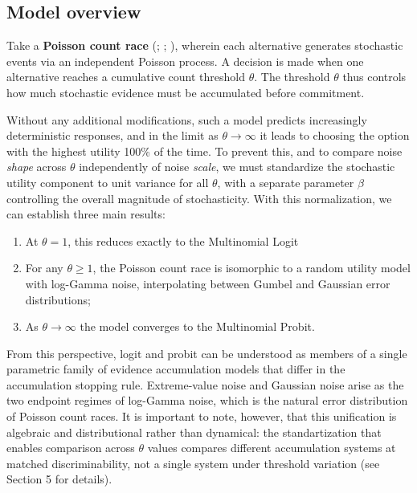 \documentclass[
  man,
  floatsintext,
  longtable,
  a4paper,
  nolmodern,
  notxfonts,
  notimes,
  colorlinks=true,linkcolor=blue,citecolor=blue,urlcolor=blue]{apa7}
\providecommand{\tightlist}{%
  \setlength{\itemsep}{0pt}\setlength{\parskip}{0pt}}
\begin{document}
\subsection{Model overview}\label{model-overview}

Take a \textbf{Poisson count race}
(;
; ), wherein each alternative generates stochastic events
via an independent Poisson process. A decision is made when one
alternative reaches a cumulative count threshold \(\theta\). The
threshold \(\theta\) thus controls how much stochastic evidence must be
accumulated before commitment.

Without any additional modifications, such a model predicts increasingly
deterministic responses, and in the limit as \(\theta \to \infty\) it
leads to choosing the option with the highest utility 100\% of the time.
To prevent this, and to compare noise \emph{shape} across \(\theta\)
independently of noise \emph{scale}, we must standardize the stochastic
utility component to unit variance for all \(\theta\), with a separate
parameter \(\beta\) controlling the overall magnitude of stochasticity.
With this normalization, we can establish three main results:

\begin{enumerate}
\def\labelenumi{\arabic{enumi}.}
\tightlist
\item
  At \(\theta = 1\), this reduces exactly to the Multinomial Logit
\item
  For any \(\theta \ge 1\), the Poisson count race is isomorphic to a
  random utility model with log-Gamma noise, interpolating between
  Gumbel and Gaussian error distributions;
\item
  As \(\theta \to \infty\) the model converges to the Multinomial
  Probit.
\end{enumerate}

From this perspective, logit and probit can be understood as members of
a single parametric family of evidence accumulation models that differ
in the accumulation stopping rule. Extreme-value noise and Gaussian
noise arise as the two endpoint regimes of log-Gamma noise, which is the
natural error distribution of Poisson count races. It is important to
note, however, that this unification is algebraic and distributional
rather than dynamical: the standartization that enables comparison
across \(\theta\) values compares different accumulation systems at
matched discriminability, not a single system under threshold variation
(see Section 5 for details).
\end{document}
